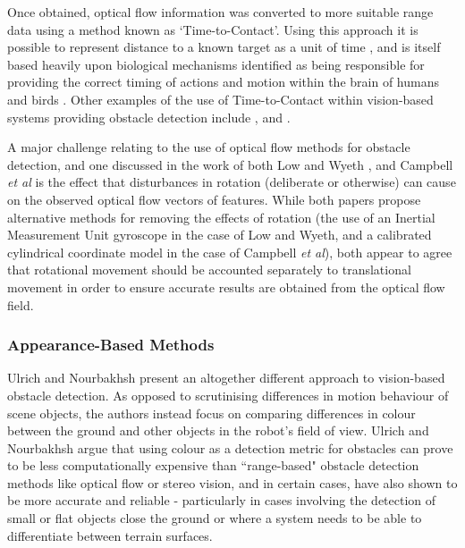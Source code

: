 Once obtained, optical flow information was converted to more suitable range data using a method known as `Time-to-Contact'. Using this approach it is possible to represent distance to a known target as a unit of time \cite{alenya}, and is itself based heavily upon biological mechanisms identified as being responsible for providing the correct timing of actions and motion within the brain of humans and birds \cite{lee-young}. Other examples of the use of Time-to-Contact within vision-based systems providing obstacle detection include \cite{alenya}, \cite{sagrebin} and \cite{thomas}.


A major challenge relating to the use of optical flow methods for obstacle detection, and one discussed in the work of both Low and Wyeth \cite{low-wyeth}, and Campbell \textit{et al} \cite{low-wyeth} is the effect that disturbances in rotation (deliberate or otherwise) can cause on the observed optical flow vectors of features. While both papers propose alternative methods for removing the effects of rotation (the use of an Inertial Measurement Unit gyroscope in the case of Low and Wyeth, and a calibrated cylindrical coordinate model in the case of Campbell \textit{et al}), both appear to agree that rotational movement should be accounted separately to translational movement in order to ensure accurate results are obtained from the optical flow field. 


\subsubsection{Appearance-Based Methods}

Ulrich and Nourbakhsh \cite{ulrich-nourbakhsh} present an altogether different approach to vision-based obstacle detection. As opposed to scrutinising differences in motion behaviour of scene objects, the authors instead focus on comparing differences in colour between the ground and other objects in the robot's field of view. Ulrich and Nourbakhsh argue that using colour as a detection metric for obstacles can prove to be less computationally expensive than ``range-based" obstacle detection methods like optical flow or stereo vision, and in certain cases, have also shown to be more accurate and reliable - particularly in cases involving the detection of small or flat objects close the ground or where a system needs to be able to differentiate between terrain surfaces. 

